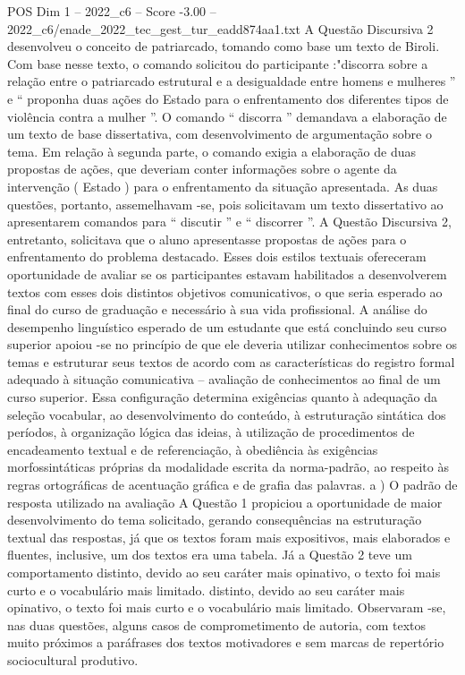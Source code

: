 \begin{textsample}{POS Dim 1 – 2022\_c6 – Score -3.00 – 2022\_c6/enade\_2022\_tec\_gest\_tur\_eadd874aa1.txt}
A Questão Discursiva 2 desenvolveu o conceito de patriarcado, tomando como base um texto de Biroli.
Com base nesse texto, o comando solicitou do participante :"discorra sobre a relação entre o patriarcado estrutural e a desigualdade entre homens e mulheres ” e “ proponha duas ações do Estado para o enfrentamento dos diferentes tipos de violência contra a mulher ”.
O comando “ discorra ” demandava a elaboração de um texto de base dissertativa, com desenvolvimento de argumentação sobre o tema.
Em relação à segunda parte, o comando exigia a elaboração de duas propostas de ações, que deveriam conter informações sobre o agente da intervenção ( Estado ) para o enfrentamento da situação apresentada.
As duas questões, portanto, assemelhavam -se, pois solicitavam um texto dissertativo ao apresentarem comandos para “ discutir ” e “ discorrer ”.
A Questão Discursiva 2, entretanto, solicitava que o aluno apresentasse propostas de ações para o enfrentamento do problema destacado.
Esses dois estilos textuais ofereceram oportunidade de avaliar se os participantes estavam habilitados a desenvolverem textos com esses dois distintos objetivos comunicativos, o que seria esperado ao final do curso de graduação e necessário à sua vida profissional.
A análise do desempenho linguístico esperado de um estudante que está concluindo seu curso superior apoiou -se no princípio de que ele deveria utilizar conhecimentos sobre os temas e estruturar seus textos de acordo com as características do registro formal adequado à situação comunicativa – avaliação de conhecimentos ao final de um curso superior.
Essa configuração determina exigências quanto à adequação da seleção vocabular, ao desenvolvimento do conteúdo, à estruturação sintática dos períodos, à organização lógica das ideias, à utilização de procedimentos de encadeamento textual e de referenciação, à obediência às exigências morfossintáticas próprias da modalidade escrita da norma-padrão, ao respeito às regras ortográficas de acentuação gráfica e de grafia das palavras. a ) O padrão de resposta utilizado na avaliação A Questão 1 propiciou a oportunidade de maior desenvolvimento do tema solicitado, gerando consequências na estruturação textual das respostas, já que os textos foram mais expositivos, mais elaborados e fluentes, inclusive, um dos textos era uma tabela.
Já a Questão 2 teve um comportamento distinto, devido ao seu caráter mais opinativo, o texto foi mais curto e o vocabulário mais limitado. distinto, devido ao seu caráter mais opinativo, o texto foi mais curto e o vocabulário mais limitado.
Observaram -se, nas duas questões, alguns casos de comprometimento de autoria, com textos muito próximos a paráfrases dos textos motivadores e sem marcas de repertório sociocultural produtivo.

\end{textsample}
